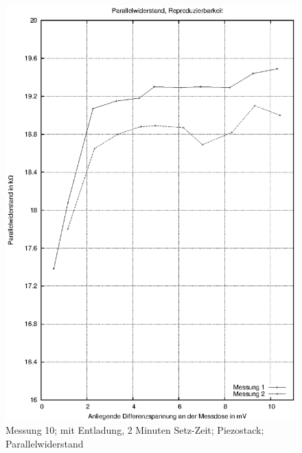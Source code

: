 \documentclass[11pt]{scrreprt} %
\begin{document}
\begin {figure}[htbp]
      \begin{center}
        \includegraphics{tabelle2_2_5}
      \end{center}
\caption{Messung 10; mit Entladung, 2 Minuten Setz-Zeit; Piezostack; Parallelwiderstand}
\label{fig:2.10}
\end{figure}
\listoffigures
\listoftables
\end{document}

